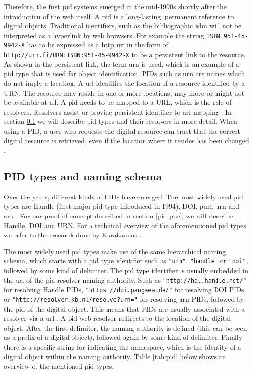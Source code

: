 Therefore, the first \gls{pid} systems emerged in the mid-1990s shortly after the introduction of the web itself. A \gls{pid} is a long-lasting, permanent reference to digital objects. Traditional identifiers, such as the bibliographic \gls{isbn} will not be interpreted as a hyperlink by web browsers. For example the string \texttt{ISBN 951-45-9942-X} has to be expressed as a \gls{http} \gls{uri} in the form of \texttt{\url{http://urn.fi/URN:ISBN:951-45-9942-X}} to be a persistent link to the resource. As shown in the persistent link, the term \gls{urn} is used, which is an example of a \gls{pid} type that is used for object identification. 
PIDs such as \gls{urn} are names which do not imply a location. A \gls{url} identifies the location of a resource identified by a URN. The resource may reside in one or more locations, may move or might not be available at all. A \gls{pid} needs to be mapped to a URL, which is the role of resolvers. Resolvers assist or provide persistent identifier to \gls{url} mapping \cite{rfc1737}. In section \ref{pid-types} we will describe \gls{pid} types and their resolvers in more detail. When using a PID, a user who requests the digital resource can trust that the correct digital resource is retrieved, even if the location where it resides has been changed \cite{pid-oview}.

\subsection{PID types and naming schema}\label{pid-types}
Over the years, different kinds of PIDs have emerged. The most widely used \gls{pid} types are Handle (first major \gls{pid} type introduced in 1994), DOI, \gls{purl}, \gls{urn} and \gls{ark} \cite{pid-oview, odin, hdl}. For our proof of concept described in section \ref{pid-poc}, we will describe Handle, DOI and URN. For a technical overview of the aforementioned \gls{pid} types we refer to the research done by Karakannas \cite{icn-bd}. 

The most widely used \gls{pid} types make use of the same hierarchical naming schema, which starts with a \gls{pid} type identifier such as \texttt{"urn"}, \texttt{"handle"} or \texttt{"doi"}, followed by some kind of delimiter. The \gls{pid} type identifier is usually embedded in the \gls{url} of the \gls{pid} resolver naming authority. Such as \texttt{"http://hdl.handle.net/"} for resolving Handle PIDs, \texttt{"https://doi.pangaea.de/"} for resolving DOI PIDs or \texttt{"http://resolver.kb.nl/resolve?urn="} for resolving \gls{urn} PIDs, followed by the \gls{pid} of the digital object. This means that PIDs are usually associated with a resolver via a \gls{url} \cite{ids, icn-bd}. A \gls{pid} web resolver redirects to the location of the digital object. After the first delimiter, the naming authority is defined (this can be seen as a prefix of a digital object), followed again by some kind of delimiter. Finally there is a specific string for indicating the namespace, which is the identity of a digital object within the naming authority. Table \ref{tab:pid} below shows an overview of the mentioned \gls{pid} types. 

